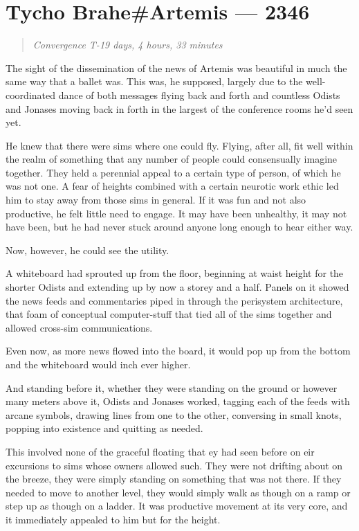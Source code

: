 \hypertarget{tycho-braheartemis-2346}{%
\chapter{Tycho Brahe\#Artemis — 2346}\label{tycho-braheartemis-2346}}

\begin{quote}
\emph{Convergence T-19 days, 4 hours, 33 minutes}
\end{quote}

The sight of the dissemination of the news of Artemis was beautiful in much the same way that a ballet was. This was, he supposed, largely due to the well-coordinated dance of both messages flying back and forth and countless Odists and Jonases moving back in forth in the largest of the conference rooms he'd seen yet.

He knew that there were sims where one could fly. Flying, after all, fit well within the realm of something that any number of people could consensually imagine together. They held a perennial appeal to a certain type of person, of which he was not one. A fear of heights combined with a certain neurotic work ethic led him to stay away from those sims in general. If it was fun and not also productive, he felt little need to engage. It may have been unhealthy, it may not have been, but he had never stuck around anyone long enough to hear either way.

Now, however, he could see the utility.

A whiteboard had sprouted up from the floor, beginning at waist height for the shorter Odists and extending up by now a storey and a half. Panels on it showed the news feeds and commentaries piped in through the perisystem architecture, that foam of conceptual computer-stuff that tied all of the sims together and allowed cross-sim communications.

Even now, as more news flowed into the board, it would pop up from the bottom and the whiteboard would inch ever higher.

And standing before it, whether they were standing on the ground or however many meters above it, Odists and Jonases worked, tagging each of the feeds with arcane symbols, drawing lines from one to the other, conversing in small knots, popping into existence and quitting as needed.

This involved none of the graceful floating that ey had seen before on eir excursions to sims whose owners allowed such. They were not drifting about on the breeze, they were simply standing on something that was not there. If they needed to move to another level, they would simply walk as though on a ramp or step up as though on a ladder. It was productive movement at its very core, and it immediately appealed to him but for the height.

